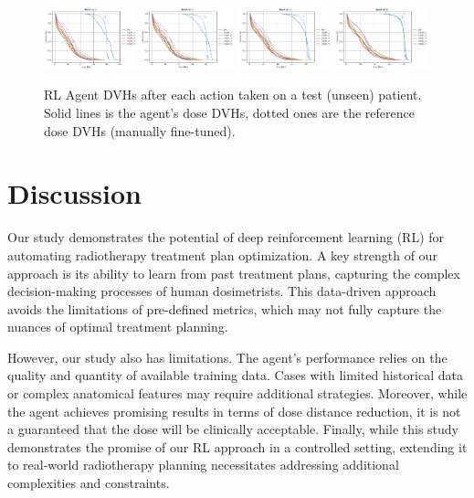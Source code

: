 \begin{figure}
	\centering
	\includegraphics[width=0.24\textwidth]{steps/distance-test-w1.pdf}	\includegraphics[width=0.24\textwidth]{steps/distance-test-w2.pdf}	\includegraphics[width=0.24\textwidth]{steps/distance-test-w3.pdf}	\includegraphics[width=0.24\textwidth]{steps/distance-test-w4.pdf}
	\caption{RL Agent DVHs after each action taken on a test (unseen) patient. Solid lines is the agent's dose DVHs, dotted ones are the reference dose DVHs (manually fine-tuned).}
	\label{fig:steps}
\end{figure}

\section{Discussion}
Our study demonstrates the potential of deep reinforcement learning (RL) for automating radiotherapy treatment plan optimization.
A key strength of our approach is its ability to learn from past treatment plans, capturing the complex decision-making processes of human dosimetrists.
This data-driven approach avoids the limitations of pre-defined metrics, which may not fully capture the nuances of optimal treatment planning.

However, our study also has limitations.
The agent's performance relies on the quality and quantity of available training data.
Cases with limited historical data or complex anatomical features may require additional strategies.
Moreover, while the agent achieves promising results in terms of dose distance reduction, it is not a guaranteed that the dose will be clinically acceptable.
Finally,  while this study demonstrates the promise of our RL approach in a controlled setting, extending it to real-world radiotherapy planning necessitates addressing additional complexities and constraints.


